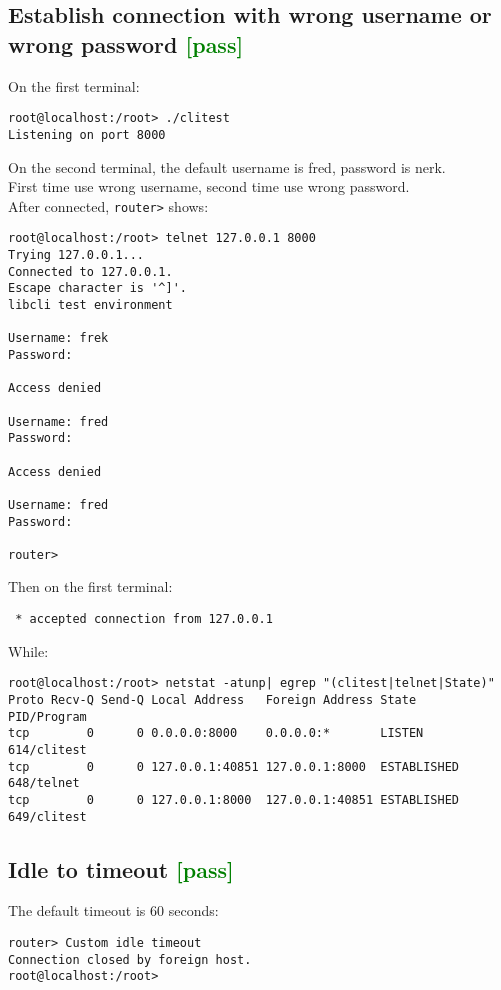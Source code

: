 \documentclass[a4paper]{report}
\begin{document}
\subsection{Establish connection with wrong username or wrong password \textcolor{green}{[pass]}}
On the first terminal:
\begin{lstlisting}
root@localhost:/root> ./clitest
Listening on port 8000
\end{lstlisting}
On the second terminal, the default username is fred, password is nerk.\\
First time use wrong username, second time use wrong password.\\
After connected, {\tt router>} shows:
\begin{lstlisting}
root@localhost:/root> telnet 127.0.0.1 8000
Trying 127.0.0.1...
Connected to 127.0.0.1.
Escape character is '^]'.
libcli test environment

Username: frek
Password: 

Access denied

Username: fred
Password: 

Access denied

Username: fred
Password:

router> 
\end{lstlisting}
Then on the first terminal:
\begin{lstlisting}
 * accepted connection from 127.0.0.1
\end{lstlisting}
While:
\begin{lstlisting}
root@localhost:/root> netstat -atunp| egrep "(clitest|telnet|State)"
Proto Recv-Q Send-Q Local Address   Foreign Address State       PID/Program
tcp        0      0 0.0.0.0:8000    0.0.0.0:*       LISTEN      614/clitest
tcp        0      0 127.0.0.1:40851 127.0.0.1:8000  ESTABLISHED 648/telnet
tcp        0      0 127.0.0.1:8000  127.0.0.1:40851 ESTABLISHED 649/clitest
\end{lstlisting}
\subsection{Idle to timeout \textcolor{green}{[pass]}}
The default timeout is 60 seconds:
\begin{lstlisting}
router> Custom idle timeout
Connection closed by foreign host.
root@localhost:/root>
\end{lstlisting}
\end{document}
